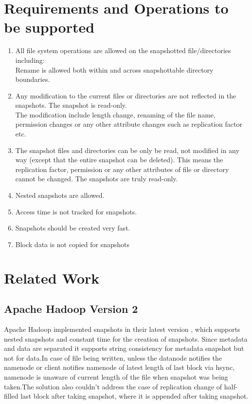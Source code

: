 \section{Requirements and Operations to be supported}
\begin{enumerate}
\item All file system operations are allowed on the snapshotted file/directories including:\\
\hspace{5em} Rename is allowed both within and across snapshottable directory boundaries.

\item Any modification to the current files or directories are not reflected in the snapshots. The
snapshot is read-only.\\
\hspace{5 em} The modification include length change, renaming of the file name, permission changes or any other attribute changes such as replication factor etc.

\item The snapshot files and directories can be only be read, not modified in any way (except that the
entire snapshot can be deleted). This means the replication factor, permission or any other
attributes of file or directory cannot be changed. The snapshots are truly read-only.

\item Nested snapshots are allowed.

\item Access time is not tracked for snapshots.

\item Snapshots should be created very fast.

\item Block data is not copied for snapshots

\end{enumerate}





\section{Related Work}

\subsection{Apache Hadoop Version 2}
Apache Hadoop implemented snapshots in their latest version \cite{Hadoop2} , which supports nested snapshots and constant time for the creation of snapshots. Since metadata and data are separated it supports string consistency for metadata snapshot but not for data.In case of file being written, unless the datanode notifies the namenode or client notifies namenode of latest length of last block via hsync, namenode is unaware of current length of the file when snapshot was being taken.The solution also couldn't address the case of replication change of half-filled last block after taking snapshot, where it is appended after taking snapshot.

